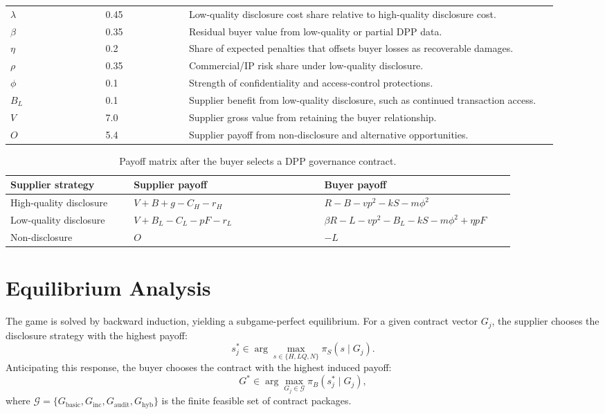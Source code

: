 \documentclass[final,5p,times,authoryear]{elsarticle}
\begin{document}
\begin{table}[t]
\begin{tabular}{@{}p{0.16\linewidth}p{0.14\linewidth}p{0.62\linewidth}@{}}
$\lambda$ & 0.45 & Low-quality disclosure cost share relative to high-quality disclosure cost. \\
$\beta$ & 0.35 & Residual buyer value from low-quality or partial DPP data. \\
$\eta$ & 0.2 & Share of expected penalties that offsets buyer losses as recoverable damages. \\
$\rho$ & 0.35 & Commercial/IP risk share under low-quality disclosure. \\
$\phi$ & 0.1 & Strength of confidentiality and access-control protections. \\
$B_L$ & 0.1 & Supplier benefit from low-quality disclosure, such as continued transaction access. \\
$V$ & 7.0 & Supplier gross value from retaining the buyer relationship. \\
$O$ & 5.4 & Supplier payoff from non-disclosure and alternative opportunities. \\
\bottomrule
\end{tabular}
\endgroup
\end{table}
\begin{table}[t]
\centering
\begingroup
\setlength{\tabcolsep}{3pt}
\small
\caption{Payoff matrix after the buyer selects a DPP governance contract.}
\label{tab:payoff_matrix}
\begin{tabular}{p{0.22\linewidth}p{0.34\linewidth}p{0.34\linewidth}}
\toprule
Supplier strategy & Supplier payoff & Buyer payoff \\
\midrule
High-quality disclosure & $V+B+g-C_H-r_H$ & $R-B-vp^2-kS-m\phi^2$ \\
Low-quality disclosure & $V+B_L-C_L-pF-r_L$ & $\beta R-L-vp^2-B_L-kS-m\phi^2+\eta pF$ \\
Non-disclosure & $O$ & $-L$ \\
\bottomrule
\end{tabular}
\endgroup
\end{table}

\section{Equilibrium Analysis}

The game is solved by backward induction, yielding a subgame-perfect equilibrium. For a given contract vector $G_j$, the supplier chooses the disclosure strategy with the highest payoff:
\begin{equation}
s_j^*\in\arg\max_{s\in\{H,LQ,N\}}\pi_S(s\mid G_j).
\end{equation}
Anticipating this response, the buyer chooses the contract with the highest induced payoff:
\begin{equation}
G^*\in\arg\max_{G_j\in\mathcal{G}}\pi_B(s_j^*\mid G_j),
\end{equation}
where $\mathcal{G}=\{G_{\mathrm{basic}},G_{\mathrm{inc}},G_{\mathrm{audit}},G_{\mathrm{hyb}}\}$ is the finite feasible set of contract packages.
\end{document}
